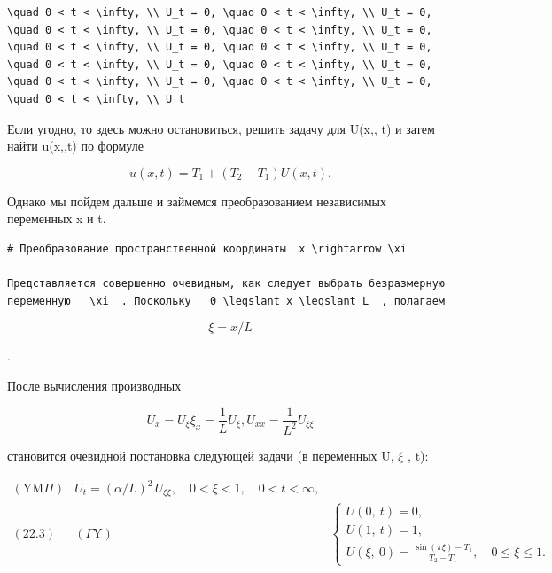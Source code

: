 \documentclass[
  ukrainian,
]{article}
\begin{document}
\begin{verbatim}
\quad 0 < t < \infty, \\ U_t = 0, \quad 0 < t < \infty, \\ U_t = 0, \quad 0 < t < \infty, \\ U_t = 0, \quad 0 < t < \infty, \\ U_t = 0, \quad 0 < t < \infty, \\ U_t = 0, \quad 0 < t < \infty, \\ U_t = 0, \quad 0 < t < \infty, \\ U_t = 0, \quad 0 < t < \infty, \\ U_t = 0, \quad 0 < t < \infty, \\ U_t = 0, \quad 0 < t < \infty, \\ U_t = 0, \quad 0 < t < \infty, \\ U_t
\end{verbatim}

Если угодно, то здесь можно остановиться, решить задачу для U\left(x,,
t\right) и затем найти u\left(x,,t\right) по формуле

\[
u(x, t) = T_1 + (T_2 - T_1) U(x, t).
\]

Однако мы пойдем дальше и займемся преобразованием независимых
переменных x и t.

\begin{verbatim}
# Преобразование пространственной координаты  x \rightarrow \xi

Представляется совершенно очевидным, как следует выбрать безразмерную переменную   \xi  . Поскольку   0 \leqslant x \leqslant L  , полагаем
\end{verbatim}

\[
\xi = x/L
\]

.

После вычисления производных

\[
U_x = U_{\xi} \xi_x = \frac{1}{L} U_{\xi},
U_{xx} = \frac{1}{L^2} U_{\xi\xi}
\]

становится очевидной постановка следующей задачи (в переменных U,
\(\xi\) , t):

\[
\begin{aligned} (\text{YM}\Pi) & U_t = (\alpha/L)^2 \, U_{\xi\xi}, \quad 0 < \xi < 1, \quad 0 < t < \infty, \\ (22.3) & (\Gamma \text{Y}) & \begin{cases} U(0,\ t) = 0, \\ U(1,\ t) = 1, \\ U(\xi,\ 0) = \frac{\sin\left(\pi\xi\right) - T_1}{T_2 - T_1}, \quad 0 \leqslant \xi \leqslant 1. \end{cases} \end{aligned}
\]
\end{document}
